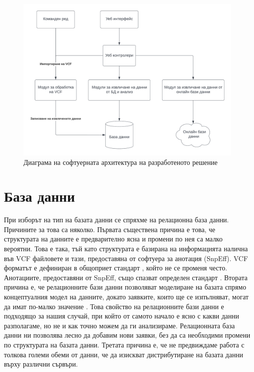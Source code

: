 \documentclass[pdftex,cyrillic,14pt,a4page,twoside,openright]{extreport}
\begin{document}
\begin{figure}[h]
  \centering
  \includegraphics[width=17cm]{figures/software_architecture}
  \caption {Диаграма на софтуерната архитектура на разработеното решение}
  \label{fig:software_architecture}
\end{figure}

\section{База данни}
При изборът на тип на базата данни се спряхме на релационна база данни. Причините за това са няколко. Първата съществена причина е това, че структурата на данните е предварително ясна и промени по нея са малко вероятни. Това е така, тъй като структурата е базирана на информацията налична във VCF файловете и тази, предоставяна от софтуера за анотация (SnpEff). VCF форматът е дефиниран в общоприет стандарт \cite{danecek2011variant}, който не се променя често. Анотациите, предоставяни от SnpEff, също спазват определен стандарт \cite{cingolani2018variant}. Втората причина е, че релационните бази данни позволяват моделиране на базата спрямо концептуалния модел на данните, докато заявките, които ще се изпълняват, могат да имат по-малко значение \cite{chebotko2015}. Това свойство на релационните бази данни е подходящо за нашия случай, при който от самото начало е ясно с какви данни разполагаме, но не и как точно можем да ги анализираме. Релационната база данни ни позволява лесно да добавим нови заявки, без да са необходими промени по структурата на базата данни. Третата причина е, че не предвиждаме работа с толкова големи обеми от данни, че да изискват дистрибутиране на базата данни върху различни сървъри.
\end{document}
